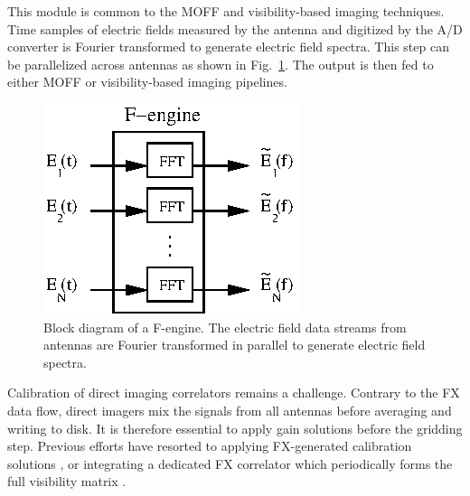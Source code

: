 \documentclass[a4paper,fleqn,usenatbib]{mnras}
\begin{document}
\par\medskip
{}
\par\medskip
\noindent This module is common to the MOFF and visibility-based imaging 
techniques. Time samples of electric fields measured by the antenna and 
digitized by the A/D converter is Fourier transformed to generate electric 
field spectra. This step can be parallelized across antennas as shown in 
Fig.~\ref{fig:f-engine}. The output is then fed to either MOFF or 
visibility-based imaging pipelines.

\begin{figure}
  \includegraphics[width=\columnwidth]{figure4}
  \caption{Block diagram of a F-engine. The electric field data streams from
    antennas are Fourier transformed in parallel to generate electric field
    spectra.}
  \label{fig:f-engine}
\end{figure}

\par\medskip
{}
\par\medskip
\noindent Calibration of direct imaging correlators remains a challenge. Contrary
to the FX data flow, direct imagers mix the signals from all antennas before
averaging and writing to disk. It is therefore essential to apply gain solutions 
before the gridding step. Previous efforts have resorted to applying FX-generated
calibration solutions \citep{zhe14,fos14}, or integrating a dedicated FX 
correlator which periodically forms the full visibility matrix 
\citep{wij09,dev09}. 
\end{document}
